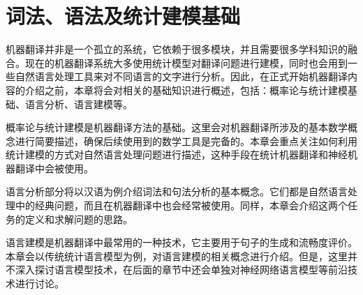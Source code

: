
%


\renewcommand\figurename{图}%
\renewcommand\tablename{表}%


\chapter{词法、语法及统计建模基础}

\parinterval 机器翻译并非是一个孤立的系统，它依赖于很多模块，并且需要很多学科知识的融合。现在的机器翻译系统大多使用统计模型对翻译问题进行建模，同时也会用到一些自然语言处理工具来对不同语言的文字进行分析。因此，在正式开始机器翻译内容的介绍之前，本章将会对相关的基础知识进行概述，包括：概率论与统计建模基础、语言分析、语言建模等。

\parinterval 概率论与统计建模是机器翻译方法的基础。这里会对机器翻译所涉及的基本数学概念进行简要描述，确保后续使用到的数学工具是完备的。本章会重点关注如何利用统计建模的方式对自然语言处理问题进行描述，这种手段在统计机器翻译和神经机器翻译中会被使用。

\parinterval 语言分析部分将以汉语为例介绍词法和句法分析的基本概念。它们都是自然语言处理中的经典问题，而且在机器翻译中也会经常被使用。同样，本章会介绍这两个任务的定义和求解问题的思路。

\parinterval 语言建模是机器翻译中最常用的一种技术，它主要用于句子的生成和流畅度评价。本章会以传统统计语言模型为例，对语言建模的相关概念进行介绍。但是，这里并不深入探讨语言模型技术，在后面的章节中还会单独对神经网络语言模型等前沿技术进行讨论。


